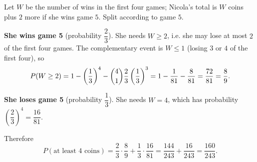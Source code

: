 Let $W$ be the number of wins in the first four games; Nicola's total is $W$ coins plus $2$ more if she wins game $5$. Split according to game $5$.

\textbf{She wins game 5} (probability $\dfrac23$). She needs $W\ge2$, i.e. she may lose at most $2$ of the first four games. The complementary event is $W\le1$ (losing $3$ or $4$ of the first four), so
\[P(W\ge2)=1-\left(\dfrac13\right)^4-\dbinom41\dfrac23\left(\dfrac13\right)^3=1-\dfrac{1}{81}-\dfrac{8}{81}=\dfrac{72}{81}=\dfrac89.\]

\textbf{She loses game 5} (probability $\dfrac13$). She needs $W=4$, which has probability $\left(\dfrac23\right)^4=\dfrac{16}{81}$.

Therefore
\[P(\text{at least }4\text{ coins})=\dfrac23\cdot\dfrac89+\dfrac13\cdot\dfrac{16}{81}=\dfrac{144}{243}+\dfrac{16}{243}=\boxed{\dfrac{160}{243}}.\]
